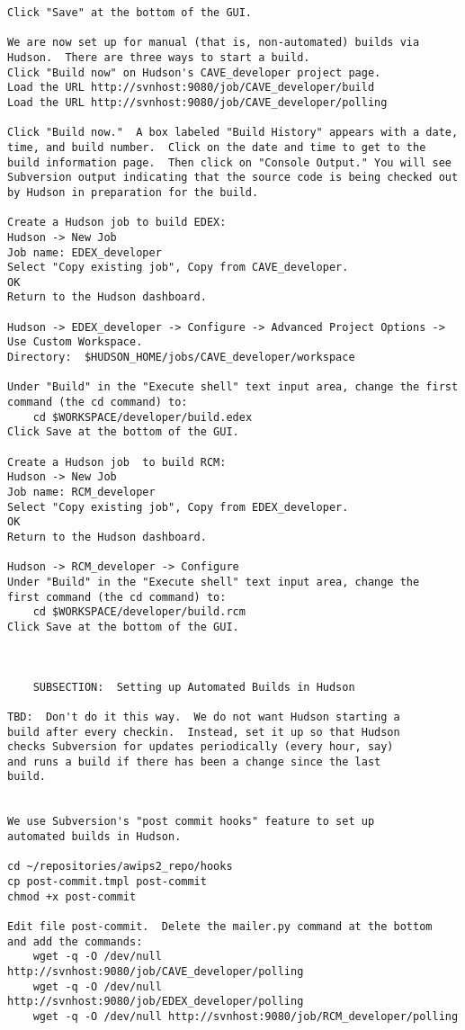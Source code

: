\begin{verbatim}
Click "Save" at the bottom of the GUI.

We are now set up for manual (that is, non-automated) builds via 
Hudson.  There are three ways to start a build.
Click "Build now" on Hudson's CAVE_developer project page.
Load the URL http://svnhost:9080/job/CAVE_developer/build
Load the URL http://svnhost:9080/job/CAVE_developer/polling

Click "Build now."  A box labeled "Build History" appears with a date,
time, and build number.  Click on the date and time to get to the
build information page.  Then click on "Console Output." You will see
Subversion output indicating that the source code is being checked out
by Hudson in preparation for the build.

Create a Hudson job to build EDEX:
Hudson -> New Job
Job name: EDEX_developer
Select "Copy existing job", Copy from CAVE_developer.
OK
Return to the Hudson dashboard.

Hudson -> EDEX_developer -> Configure -> Advanced Project Options ->
Use Custom Workspace.
Directory:  $HUDSON_HOME/jobs/CAVE_developer/workspace

Under "Build" in the "Execute shell" text input area, change the first 
command (the cd command) to:
    cd $WORKSPACE/developer/build.edex
Click Save at the bottom of the GUI.

Create a Hudson job  to build RCM:
Hudson -> New Job
Job name: RCM_developer
Select "Copy existing job", Copy from EDEX_developer.
OK
Return to the Hudson dashboard.

Hudson -> RCM_developer -> Configure
Under "Build" in the "Execute shell" text input area, change the 
first command (the cd command) to:
    cd $WORKSPACE/developer/build.rcm
Click Save at the bottom of the GUI.



	SUBSECTION:  Setting up Automated Builds in Hudson

TBD:  Don't do it this way.  We do not want Hudson starting a
build after every checkin.  Instead, set it up so that Hudson
checks Subversion for updates periodically (every hour, say)
and runs a build if there has been a change since the last
build.


We use Subversion's "post commit hooks" feature to set up 
automated builds in Hudson.

cd ~/repositories/awips2_repo/hooks
cp post-commit.tmpl post-commit
chmod +x post-commit

Edit file post-commit.  Delete the mailer.py command at the bottom
and add the commands:
    wget -q -O /dev/null http://svnhost:9080/job/CAVE_developer/polling
    wget -q -O /dev/null http://svnhost:9080/job/EDEX_developer/polling
    wget -q -O /dev/null http://svnhost:9080/job/RCM_developer/polling


\end{verbatim}
